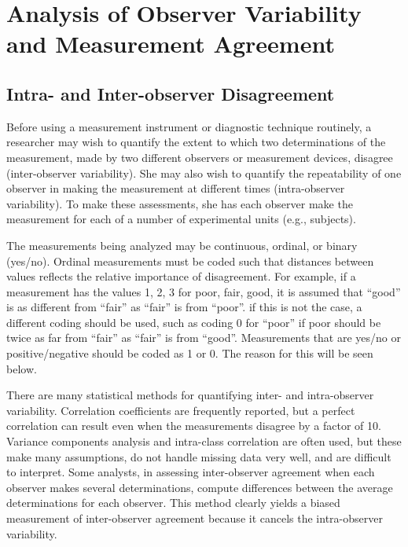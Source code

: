 

\chapter{Analysis of Observer Variability and Measurement
  Agreement}
\section{Intra- and Inter-observer Disagreement}
Before using a measurement instrument or diagnostic technique
routinely, a researcher may wish to quantify the extent to which two
determinations of the measurement, made by two different observers
or measurement devices, disagree (inter-observer variability).  She
may also wish to quantify the repeatability of one observer in making
the measurement at different times (intra-observer variability). To
make these assessments, she has each observer make the measurement
for each of a number of experimental units (e.g., subjects).

The measurements being analyzed may be continuous, ordinal, or binary
(yes/no). Ordinal measurements must be coded such that distances between
values reflects the relative importance of disagreement. For example, if a
measurement has the values 1, 2, 3 for poor, fair, good, it is assumed that
``good'' is as different from ``fair'' as ``fair'' is from
``poor''. if this is  not the case, a different coding should be used,
such as coding 0 for ``poor'' if poor should be twice as far from
``fair'' as ``fair'' is from ``good''. Measurements that are yes/no or
positive/negative should be coded as 1 or 0. The reason for this will
be seen below.  

There are many statistical methods for quantifying inter- and
intra-observer variability.  Correlation coefficients are frequently reported,
but a perfect correlation can result even when the measurements disagree by a
factor of 10.  Variance components analysis and intra-class
correlation are often used, but these make many assumptions, do not
handle missing data very well, and are difficult to interpret. Some
analysts, in assessing 
inter-observer agreement when each observer makes several determinations,
compute differences between the average determinations for each observer.
This method clearly yields a biased measurement of inter-observer agreement
because it cancels the intra-observer variability.

